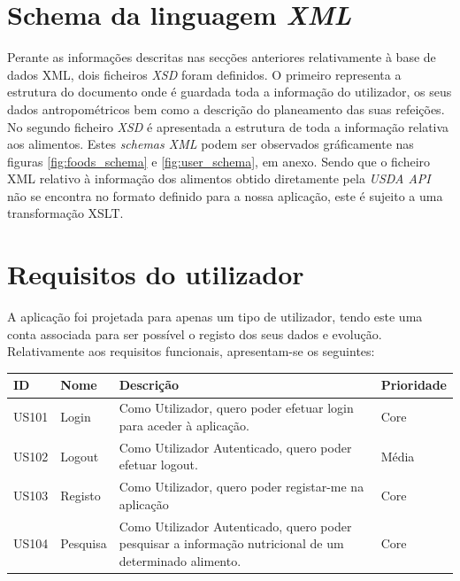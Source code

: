 \documentclass[twocolumn,twoside,11pt,a4paper]{article}
\begin{document}
\section{Schema da linguagem \textit{XML}}
Perante as informações descritas nas secções anteriores relativamente à base de dados XML, dois ficheiros \textit{XSD} foram definidos. O primeiro representa a estrutura do documento onde é guardada toda a informação do utilizador, os seus dados antropométricos bem como a descrição do planeamento das suas refeições. No segundo ficheiro \textit{XSD} é apresentada a estrutura de toda a informação relativa aos alimentos.
Estes \textit{schemas XML} podem ser observados gráficamente nas figuras \ref{fig:foods_schema} e \ref{fig:user_schema}, em anexo.
Sendo que o ficheiro XML relativo à informação dos alimentos obtido diretamente pela \textit{USDA API} não se encontra no formato definido para a nossa aplicação, este é sujeito a uma transformação XSLT.


\section{Requisitos do utilizador}
A aplicação foi projetada para apenas um tipo de utilizador, tendo este uma conta associada para ser possível o registo dos seus dados e evolução. Relativamente aos requisitos funcionais, apresentam-se os seguintes:

\begin{center}
   \begin{tabular}{ | l | p{1.4cm} | p{3.0cm} | p{1.6cm}  |}
   \hline
   ID & Nome & Descrição & Prioridade \\ \hline
   US101 & Login &  Como Utilizador, quero poder efetuar login para aceder à aplicação. &  Core  \\ \hline
   US102 & Logout &  Como Utilizador Autenticado, quero poder efetuar logout. &  Média  \\ \hline
   US103 & Registo &  Como Utilizador, quero poder registar-me na aplicação &  Core  \\ \hline
   US104 & Pesquisa &  Como Utilizador Autenticado, quero poder pesquisar a informação nutricional de um determinado alimento. &  Core  \\ \hline

      \end{tabular}
\end{center}
\end{document}
